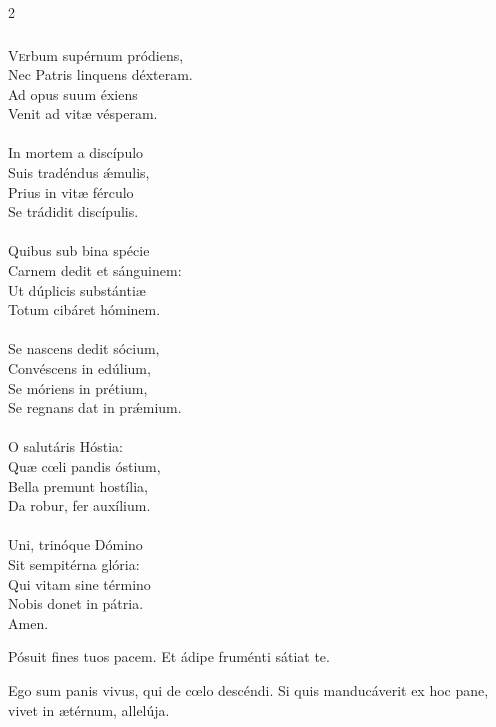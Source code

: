\documentclass[9pt,twoside]{extarticle}
\begin{document}
\begin{multicols}{2}
\subsubsection*{\center {}}
\begin{center}\end{center}
\lettrine{V}erbum supérnum pródiens,\\
Nec Patris linquens déxteram.\\
Ad opus suum éxiens\\
Venit ad vitæ vésperam.\\
\\
In mortem a discípulo\\
Suis tradéndus ǽmulis,\\
Prius in vitæ férculo\\
Se trádidit discípulis.\\
\\
Quibus sub bina spécie\\
Carnem dedit et sánguinem:\\
Ut dúplicis substántiæ\\
Totum cibáret hóminem.\\
\\
Se nascens dedit sócium,\\
Convéscens in edúlium,\\
Se móriens in prétium,\\
Se regnans dat in prǽmium.\\
\\
O salutáris Hóstia:\\
Quæ cœli pandis óstium,\\
Bella premunt hostília,\\
Da robur, fer auxílium.\\
\\
Uni, trinóque Dómino\\
Sit sempitérna glória:\\
Qui vitam sine término\\
Nobis donet in pátria.\\
Amen.

\begin{tightlist}{}
\item {} Pósuit fines tuos pacem.  Et ádipe fruménti sátiat te.
\item {} Ego sum panis vivus, qui de cœlo descéndi. Si quis manducáverit ex hoc pane, vivet in ætérnum, allelúja. 
\end{tightlist}


\end{multicols}
\end{document}
